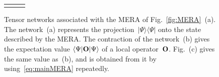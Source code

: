 \documentclass[floats,prb,twocolumn]{revtex4}
\newcommand{\ket}[1]{|#1\rangle}
\newcommand{\bra}[1]{\langle#1|}
\newcommand{\proj}[1]{|#1\rangle\langle#1|}
\newcommand*{\Xsingleoperator}{{\bf O}}
\newcommand*{\merastate}{\raisebox{-170.703pt}{\epsfig{file=merastate34.eps,clip=}}}
\newcommand*{\meraexpectation}{\raisebox{-170.703pt}{\epsfig{file=meraexpectation35.eps,clip=}}}
\newcommand*{\meraexpectationsimplified}{\raisebox{-170.703pt}{\epsfig{file=meraexpectationsimplified36.eps,clip=}}}
\begin{document}
\begin{figure} 
\centering
\begin{tabular}{ccc}
\subfigure[]{\hspace{-0.6cm}\label{f:state}\scalebox{0.9}{\merastate}}
&
\subfigure[]{\hspace{-0.6cm}\label{f:expectation}\scalebox{0.9}{\meraexpectation}}
&
\subfigure[]{\hspace{-0.6cm}\label{f:expectationsimplified}\scalebox{0.9}{\meraexpectationsimplified}}
\end{tabular}
\caption{Tensor networks associated with  the MERA of Fig.~\ref{fig:MERA}~(a). The network~(a) represents the projection~$\proj{\Psi}$ onto the state described by the MERA. The contraction of the network~(b) gives the expectation value $\bra{\Psi}\Xsingleoperator\ket{\Psi}$ of a local operator~$\Xsingleoperator$. Fig.~(c) gives the same value as~(b), and is obtained from it by using~\eqref{eq:mainMERA} repeatedly. \label{fig:MERAstateandexpectation}}
\end{figure}
\end{document}
